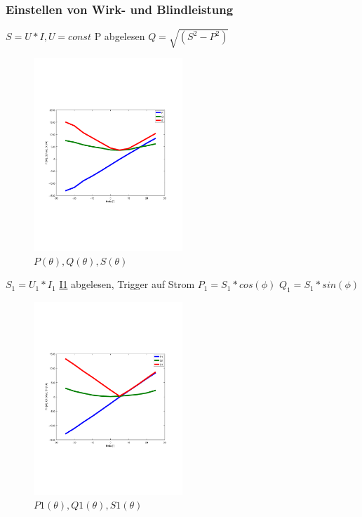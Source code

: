 \subsubsection{Einstellen von Wirk- und Blindleistung}


$S = U*I, U=const$
P abgelesen
$Q = \sqrt{(S^2 - P^2)}$
\begin{figure}[!ht]
  \begin{center}
  \includegraphics[width=0.5\textwidth, trim={1cm 6.5cm 2cm 7cm},clip]{pic/6_1_grundfrequenztaktung/6_1_2_einst_wirk_und_blindleistung/P_Q_S.pdf}
  \caption{$P(\theta), Q(\theta), S(\theta)$}
  \label{fig:6_1_2_0}
  \end{center}
\end{figure}



$S_1 = U_1 * I_1$
\underline{I1} abgelesen, Trigger auf Strom
$P_1 = S_1 * cos(\phi)$
$Q_1 = S_1 * sin(\phi)$
\begin{figure}[!ht]
  \begin{center}
  \includegraphics[width=0.5\textwidth, trim={1cm 6.5cm 2cm 7cm},clip]{pic/6_1_grundfrequenztaktung/6_1_2_einst_wirk_und_blindleistung/P1_Q1_S1.pdf}
  \caption{$P1(\theta), Q1(\theta), S1(\theta)$}
  \label{fig:6_1_2_1}
  \end{center}
\end{figure}


